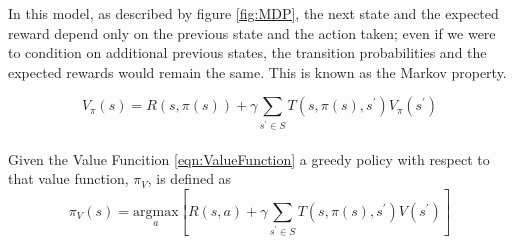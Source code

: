 In this model, as described by figure \ref{fig:MDP}, the next state and the expected reward depend only on the previous state and the action taken; even if we were to condition on additional previous states, the transition probabilities and the expected rewards would remain the same. This is known as the Markov property.

\begin{equation}
	V_{\pi}(s) = R(s,\pi(s)) + \gamma \sum_{s^\prime \in S} T(s, \pi(s), s^\prime) V_{\pi}(s^\prime)
	\label{eqn:ValueFunction}
\end{equation}
\\
Given the Value Funcition \ref{eqn:ValueFunction} a greedy policy with respect to that value function, $\pi_V$, is defined as 
\begin{equation}
	\pi_V(s) = \underset{a}{\mathrm{argmax}}\left[R(s,a) + \gamma \sum_{s^\prime \in S} T(s, \pi(s), s^\prime) V(s^\prime) \right]
\end{equation}